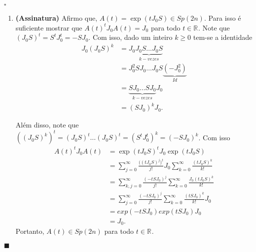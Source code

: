 \documentclass[12pt]{book}
\newenvironment{prova}[1]{$\square$ #1}{\hfill$\blacksquare$}
\newcommand{\estruturacomplexa}{J_{0}}
\newcommand{\gruposimpletico}[1]{Sp(#1)}
\newcommand{\real}[1]{\mathbb{R}^{#1}}
\newcommand{\reta}{\real{}}
\begin{document}
\begin{prova}
\begin{enumerate}
			\item \textbf{(Assinatura)} Afirmo que, $A(t)=\exp(t\estruturacomplexa S) \in\gruposimpletico{2n}$. Para isso é suficiente mostrar que $A(t)^{t}\estruturacomplexa A(t)= \estruturacomplexa$ para todo $t \in \reta$. Note que $(\estruturacomplexa S)^{t} 
			= S^{t}\estruturacomplexa^{t} = -S\estruturacomplexa$. Com isso, dado um inteiro $k\geq 0$ tem-se a identidade 
			$$
			\begin{aligned}
			\estruturacomplexa (\estruturacomplexa S)^{k} 
			&= \estruturacomplexa\underbrace{\estruturacomplexa  S\dots \estruturacomplexa S}_{k-vezes} 
			\\
			&= \estruturacomplexa^{2}  S\estruturacomplexa \dots \estruturacomplexa S \underbrace{(-\estruturacomplexa^{2})}_{Id} 
			\\
			&=\underbrace{ S\estruturacomplexa \dots  S \estruturacomplexa }_{k-vezes}\estruturacomplexa 
			\\
			&= (S\estruturacomplexa)^{k}\estruturacomplexa.
			\end{aligned}
			$$
			
			Além disso, note que $((\estruturacomplexa S)^{k})^{t} = (\estruturacomplexa S)^{t}\dots (\estruturacomplexa S)^{t} = (S^{t}\estruturacomplexa^{t} )^{k} = (-S\estruturacomplexa)^{k}$. Com isso
			$$
			\begin{aligned}
			A(t)^{t}\estruturacomplexa A(t)
			&=
			\exp(t\estruturacomplexa S)^{t}\estruturacomplexa\exp(t\estruturacomplexa S)
			\\
			&=\sum_{j=0}^{\infty}\frac{\big( (t\estruturacomplexa S)^{j}\big)^{t}}{j!}\estruturacomplexa \sum_{k=0}^{\infty}\frac{(t\estruturacomplexa S)^{k}}{k!}
			\\
			&=\sum_{k,j=0}^{\infty}\frac{(-tS\estruturacomplexa)^{j}}{j!} \sum_{k=0}^{\infty}\frac{\estruturacomplexa(t\estruturacomplexa S)^{k}}{k!}
			\\
			&=\sum_{j=0}^{\infty}\frac{(-tS\estruturacomplexa)^{j}}{j!} \sum_{k=0}^{\infty}\frac{(tS\estruturacomplexa)^{k}}{k!}\estruturacomplexa
			\\
			&=exp(-tS\estruturacomplexa)exp(tS\estruturacomplexa)\estruturacomplexa
			\\
			&=\estruturacomplexa.
			\end{aligned}
			$$
			Portanto, $A(t) \in \gruposimpletico{2n}$ para todo $t\in \reta$.
			

\end{enumerate}
\end{prova}
\end{document}
